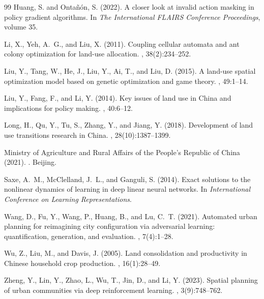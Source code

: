 \documentclass[preprint,12pt]{elsarticle}
\begin{document}
\begin{thebibliography}{99}
Huang, S. and Onta\~{n}\'{o}n, S. (2022).
\newblock A closer look at invalid action masking in policy gradient algorithms.
\newblock In {\em The International FLAIRS Conference Proceedings}, volume 35.

Li, X., Yeh, A.~G., and Liu, X. (2011).
\newblock Coupling cellular automata and ant colony optimization for land-use allocation.
, 38(2):234--252.

Liu, Y., Tang, W., He, J., Liu, Y., Ai, T., and Liu, D. (2015).
\newblock A land-use spatial optimization model based on genetic optimization and game theory.
, 49:1--14.

Liu, Y., Fang, F., and Li, Y. (2014).
\newblock Key issues of land use in {China} and implications for policy making.
, 40:6--12.

Long, H., Qu, Y., Tu, S., Zhang, Y., and Jiang, Y. (2018).
\newblock Development of land use transitions research in {China}.
, 28(10):1387--1399.

Ministry of Agriculture and Rural Affairs of the People's Republic of China (2021).
.
\newblock Beijing.

Saxe, A.~M., McClelland, J.~L., and Ganguli, S. (2014).
\newblock Exact solutions to the nonlinear dynamics of learning in deep linear neural networks.
\newblock In {\em International Conference on Learning Representations}.

Wang, D., Fu, Y., Wang, P., Huang, B., and Lu, C.~T. (2021).
\newblock Automated urban planning for reimagining city configuration via adversarial learning: quantification, generation, and evaluation.
, 7(4):1--28.

Wu, Z., Liu, M., and Davis, J. (2005).
\newblock Land consolidation and productivity in {Chinese} household crop production.
, 16(1):28--49.

Zheng, Y., Lin, Y., Zhao, L., Wu, T., Jin, D., and Li, Y. (2023).
\newblock Spatial planning of urban communities via deep reinforcement learning.
, 3(9):748--762.

\end{thebibliography}
\end{document}

